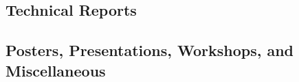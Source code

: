 \subsection{Technical Reports}
\begin{refsection}
\nocite{*}
\printbibliography[heading=none,sorting=ynt]
\end{refsection}

\subsection{Posters, Presentations, Workshops, and Miscellaneous}
\begin{refsection}
\nocite{*}
\printbibliography[heading=none,sorting=ynt]
\end{refsection}




